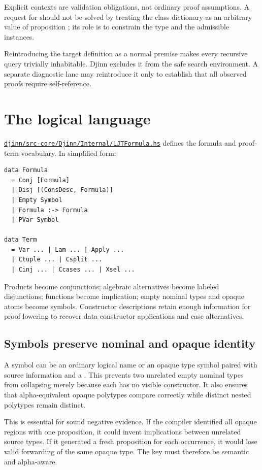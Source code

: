 \documentclass[10pt,letterpaper,oneside]{report}
\newcommand{\code}[1]{\texttt{\detokenize{#1}}}
\def\DjexBase{https://github.com/VladimirReshetnikov/Djex/blob/d3d9662598460316bdcd177ce6768c521e764aa8/}
\newcommand{\dpath}[1]{\href{\DjexBase#1}{\nolinkurl{#1}}}
\begin{document}
Explicit contexts are validation obligations, not ordinary proof assumptions. A request for \code{C a => a -> a} should not be solved by treating the class dictionary as an arbitrary value of proposition \code{C a}; its role is to constrain the type and the admissible instances.

\begin{pitfallbox}
Reintroducing the target definition as a normal premise makes every recursive query trivially inhabitable. Djinn excludes it from the safe search environment. A separate diagnostic lane may reintroduce it only to establish that all observed proofs require self-reference.
\end{pitfallbox}

\section{The logical language}

\dpath{djinn/src-core/Djinn/Internal/LJTFormula.hs} defines the formula and proof-term vocabulary. In simplified form:

\begin{lstlisting}[language=Haskellish]
data Formula
  = Conj [Formula]
  | Disj [(ConsDesc, Formula)]
  | Empty Symbol
  | Formula :-> Formula
  | PVar Symbol

data Term
  = Var ... | Lam ... | Apply ...
  | Ctuple ... | Csplit ...
  | Cinj ... | Ccases ... | Xsel ...
\end{lstlisting}

Products become conjunctions; algebraic alternatives become labeled disjunctions; functions become implication; empty nominal types and opaque atoms become symbols. Constructor descriptions retain enough information for proof lowering to recover data-constructor applications and case alternatives.

\subsection{Symbols preserve nominal and opaque identity}

A symbol can be an ordinary logical name or an opaque type symbol paired with source information and a \code{TypeAtomKey}. This prevents two unrelated empty nominal types from collapsing merely because each has no visible constructor. It also ensures that alpha-equivalent opaque polytypes compare correctly while distinct nested polytypes remain distinct.

This is essential for sound negative evidence. If the compiler identified all opaque regions with one proposition, it could invent implications between unrelated source types. If it generated a fresh proposition for each occurrence, it would lose valid forwarding of the same opaque type. The key must therefore be semantic and alpha-aware.
\end{document}
